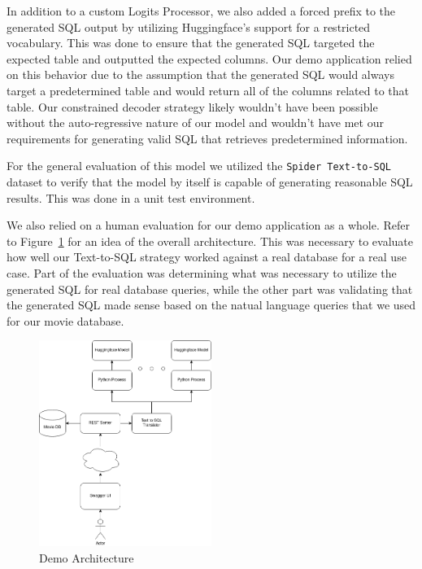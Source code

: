 \documentclass[11pt]{article}
\begin{document}
In addition to a custom Logits Processor, we also added a forced prefix to the generated SQL output by utilizing Huggingface's support for a restricted vocabulary. This was done to ensure that the generated SQL targeted the expected table and outputted the expected columns. Our demo application relied on this behavior due to the assumption that the generated SQL would always target a predetermined table and would return all of the columns related to that table. Our constrained decoder strategy likely wouldn't have been possible without the auto-regressive nature of our model and wouldn't have met our requirements for generating valid SQL that retrieves predetermined information.

For the general evaluation of this model we utilized the \texttt{Spider Text-to-SQL} dataset \citep{yu2019spider} to verify that the model by itself is capable of generating reasonable SQL results. This was done in a unit test environment.

We also relied on a human evaluation for our demo application as a whole. Refer to Figure~\ref{fig:architecture} for an idea of the overall architecture. This was necessary to evaluate how well our Text-to-SQL strategy worked against a real database for a real use case. Part of the evaluation was determining what was necessary to utilize the generated SQL for real database queries, while the other part was validating that the generated SQL made sense based on the natual language queries that we used for our movie database.

\begin{figure}
\centering
\includegraphics[width=0.5\textwidth]{demo-architecture.drawio.png}
\caption{\label{fig:architecture} Demo Architecture}
\end{figure}
\end{document}
